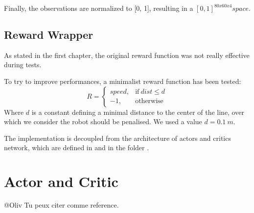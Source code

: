 Finally, the observations are normalized to [0, 1], resulting in a $[0, 1]^{80x60x4} space$.

\subsection{Reward Wrapper}

As stated in the first chapter, the original reward function was not really effective during tests.

To try to improve performances, a minimalist reward function has been tested:
\begin{equation}
    R =
    \begin{cases}
        speed, & \text{if}\ dist \leq d\\
        -1, & \text{otherwise}
    \end{cases}
\end{equation}
Where $d$ is a constant defining a minimal distance to the center of the line, over which we consider the robot should be penalised. We used a value $d=0.1\ m$.

The implementation is decoupled from the architecture of actors and critics network, which are defined in  and  in the folder .

\section{Actor and Critic}%

@Oliv
Tu peux citer \cite{actorcritic} comme reference.
